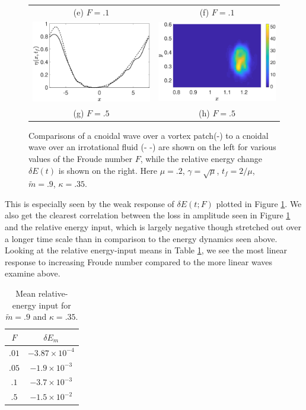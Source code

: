 \documentclass[a4paper,11pt]{article}
\begin{document}
\begin{figure}
\begin{tabular}{cc}
(e)  $F=.1$ & (f)  $F=.1$\\
\includegraphics[width=.35\textwidth]{profiles_wm_50_modu_pt9} & \includegraphics[width=.35\textwidth]{vorticity_wm_50_modu_pt9}\\
(g)  $F=.5$ & (h)  $F=.5$
\end{tabular}
\caption{Comparisons of a cnoidal wave over a vortex patch(-) to a cnoidal wave over an irrotational fluid (- -) are shown on the left for various values of the Froude number $F$, while the relative energy change $\delta E(t)$ is shown on the right.  Here $\mu=.2$, $\gamma=\sqrt{\mu}$, $t_{f}=2/\mu$, $\tilde{m}=.9$, $\kappa = .35$.}
\label{fig:highsolwave}
\end{figure}

This is especially seen by the weak response of $\delta E(t;F)$ plotted in Figure \ref{fig:highsolwave}.  We also get the clearest correlation between the loss in amplitude seen in Figure \ref{fig:highsolwave} and the relative energy input, which is largely negative though stretched out over a longer time scale than in comparison to the energy dynamics seen above.  Looking at the relative energy-input means in Table \ref{tab:highsolmean}, we see the most linear response to increasing Froude number compared to the more linear waves examine above.  
\begin{table}
\centering
\begin{tabular}{c|c}
$F$ & $\delta E_{m}$ \\
\hline
$.01$ & $-3.87 \times 10^{-4}$\\
$.05$ & $-1.9 \times 10^{-3}$\\
$.1$ & $-3.7 \times 10^{-3}$\\
$.5$ & $-1.5 \times 10^{-2}$
\end{tabular}
\caption{Mean relative-energy input for $\tilde{m}=.9$ and $\kappa=.35$.}
\label{tab:highsolmean}
\end{table}
\end{document}
